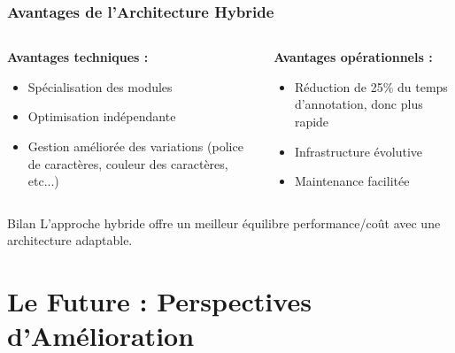 \documentclass[
	11pt,
	aspectratio=169,
]{beamer}
\begin{document}
\begin{frame}
	\frametitle{Avantages de l'Architecture Hybride}
	
	\begin{columns}[t]
		\begin{column}{0.5\textwidth}
			\textbf{Avantages techniques :}
			\begin{itemize}
				\item Spécialisation des modules
				\item Optimisation indépendante
				\item Gestion améliorée des variations
				(police de caractères, couleur des caractères, etc...)
			\end{itemize}
		\end{column}
		
		\begin{column}{0.5\textwidth}
			\textbf{Avantages opérationnels :}
			\begin{itemize}
				\item Réduction de 25\% du temps d'annotation, donc plus rapide
				\item Infrastructure évolutive
				\item Maintenance facilitée
			\end{itemize}
		\end{column}
	\end{columns}
	
	\bigskip
	
	\begin{exampleblock}{Bilan}
		L'approche hybride offre un meilleur équilibre performance/coût avec une architecture adaptable.
	\end{exampleblock}
\end{frame}


\section{Le Future : Perspectives d'Amélioration}
\end{document}
